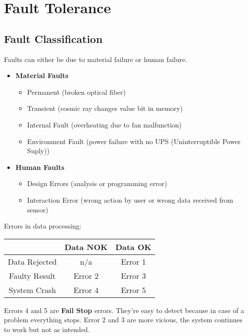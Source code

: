 \documentclass[../main.tex]{subfiles}
\begin{document}
\chapter{Fault Tolerance}

\section{Fault Classification}
Faults can either be due to material failure or human failure. 
\begin{itemize}
	\item \textbf{Material Faults}
	\begin{itemize}
		\item Permanent (broken optical fiber)
		\item Transient (cosmic ray changes value bit in memory)
		\item Internal Fault (overheating due to fan malfunction)
		\item Environment Fault (power failure with no UPS (Uninterruptible Power Suply))
	\end{itemize}
	\item \textbf{Human Faults}
	\begin{itemize}
		\item Design Errors (analysis or programming error)
		\item Interaction Error (wrong action by user or wrong data received from sensor)
	\end{itemize}
\end{itemize}
Errors in data processing:
\begin{center}
\begin{tabular}{|c|c|c|}
\hline 
 & Data NOK & Data OK \\ 
\hline 
Data Rejected & n/a & Error 1 \\ 
\hline 
Faulty Result & Error 2 & Error 3 \\ 
\hline 
System Crash & Error 4 & Error 5 \\ 
\hline 
\end{tabular} 
\end{center}
Errors 4 and 5 are  \textbf{Fail Stop} errors. They're easy to detect because in case of a problem everything stops. Error 2 and 3 are more vicious, the system continues to work but not as intended. 
\end{document}
